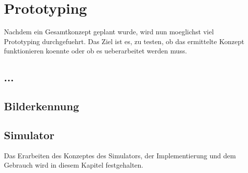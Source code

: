 \section{Prototyping}

Nachdem ein Gesamtkonzept geplant wurde, wird nun moeglichst viel Prototyping durchgefuehrt. Das Ziel ist es, zu testen, ob das ermittelte Konzept funktionieren koennte oder ob es ueberarbeitet werden muss.

\subsection{...}

\subsection{Bilderkennung}

\subsection{Simulator}

Das Erarbeiten des Konzeptes des Simulators, der Implementierung und dem Gebrauch wird in diesem Kapitel festgehalten.